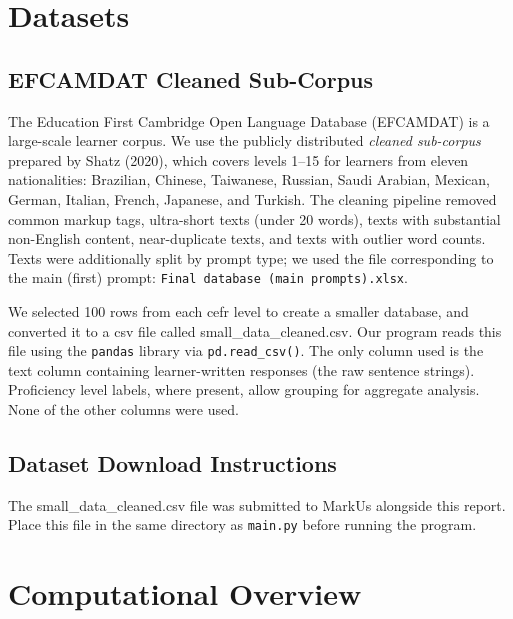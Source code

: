 \documentclass[11pt]{article}
\begin{document}
\section*{Datasets}

\subsection*{EFCAMDAT Cleaned Sub-Corpus}
 
The Education First Cambridge Open Language Database (EFCAMDAT) \cite{efcamdat} is a large-scale learner corpus. We use the publicly distributed \textit{cleaned sub-corpus} prepared by Shatz (2020), which covers levels 1--15 for learners from eleven nationalities: Brazilian, Chinese, Taiwanese, Russian, Saudi Arabian, Mexican, German, Italian, French, Japanese, and Turkish. The cleaning pipeline removed common markup tags, ultra-short texts (under 20 words), texts with substantial non-English content, near-duplicate texts, and texts with outlier word counts. Texts were additionally split by prompt type; we used the file corresponding to the main (first) prompt: \texttt{Final database (main prompts).xlsx}.

We selected 100 rows from each cefr level to create a smaller database, and converted it to a csv file called small\_data\_cleaned.csv. Our program reads this file using the \texttt{pandas} library \cite{pandas} via \texttt{pd.read\_csv()}. The only column used is the text column containing learner-written responses (the raw sentence strings). Proficiency level labels, where present, allow grouping for aggregate analysis. None of the other columns were used. 
 
\subsection*{Dataset Download Instructions}
 
The small\_data\_cleaned.csv file was submitted to MarkUs alongside this report. 
Place this file in the same directory as \texttt{main.py} before running the program.
 
\section*{Computational Overview}
 
\end{document}
